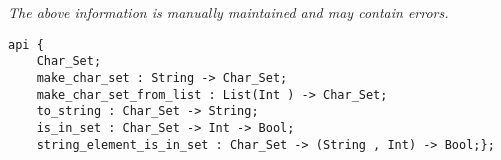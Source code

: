 \label{api:Char\_Set}

{\tiny \it The above information is manually maintained and may contain errors.}
\begin{verbatim}
api {
    Char_Set;
    make_char_set : String -> Char_Set;
    make_char_set_from_list : List(Int ) -> Char_Set;
    to_string : Char_Set -> String;
    is_in_set : Char_Set -> Int -> Bool;
    string_element_is_in_set : Char_Set -> (String , Int) -> Bool;};
\end{verbatim}
